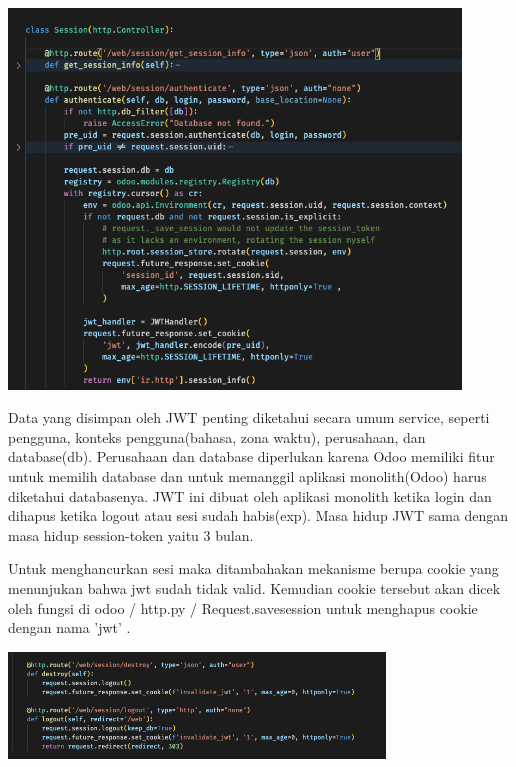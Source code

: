 \begin{center}
	\includegraphics[width=12cm]{img/bab_4/sessionRoute.png}
	\label{fig:sessionRoute}
\end{center}

Data yang disimpan oleh JWT penting diketahui secara umum service, seperti pengguna, konteks pengguna(bahasa, zona waktu), perusahaan, dan database(db).  Perusahaan dan database diperlukan karena Odoo memiliki fitur untuk memilih database dan untuk memanggil  aplikasi monolith(Odoo) harus diketahui databasenya. JWT ini dibuat oleh aplikasi monolith ketika login dan dihapus ketika logout atau sesi sudah habis(exp). Masa hidup JWT sama dengan masa hidup session-token yaitu 3 bulan.

Untuk menghancurkan sesi maka ditambahakan mekanisme berupa cookie yang menunjukan bahwa jwt sudah tidak valid. Kemudian cookie tersebut akan dicek oleh fungsi di odoo / http.py / Request.savesession untuk menghapus cookie dengan nama 'jwt' . 

\begin{center}
	\includegraphics[width=10cm]{img/bab_4/triggerCookieDel.png}
	\label{fig:triggerCookieDel}
\end{center}

